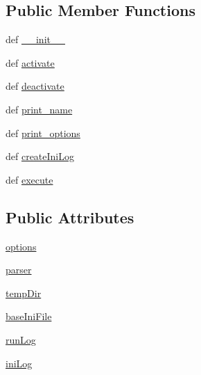 \subsection*{Public Member Functions}
\begin{DoxyCompactItemize}
\item 
def \hyperlink{classcombinatorial_1_1_combinatorial_ex_a9a4fbfcf64b1204c14509d348dd23b5d}{\-\_\-\-\_\-init\-\_\-\-\_\-}
\item 
def \hyperlink{classcombinatorial_1_1_combinatorial_ex_a8d0b7c0da355183d8124871bee76b0bd}{activate}
\item 
def \hyperlink{classcombinatorial_1_1_combinatorial_ex_ad53efcff93773cce7ed9cfc2fef38ab3}{deactivate}
\item 
def \hyperlink{classcombinatorial_1_1_combinatorial_ex_a19f6321bf42ab92280c5e3b0a3af89d0}{print\-\_\-name}
\item 
def \hyperlink{classcombinatorial_1_1_combinatorial_ex_ae802ad33a050ada42292e7c80fb3e486}{print\-\_\-options}
\item 
def \hyperlink{classcombinatorial_1_1_combinatorial_ex_ac0216f0d0041c35a91e01ac9dafd49da}{create\-Ini\-Log}
\item 
def \hyperlink{classcombinatorial_1_1_combinatorial_ex_a5a5fbd1692c100374ee458e4babc9832}{execute}
\end{DoxyCompactItemize}
\subsection*{Public Attributes}
\begin{DoxyCompactItemize}
\item 
\hyperlink{classcombinatorial_1_1_combinatorial_ex_a20eda525b3947495bb6084c560dcca27}{options}
\item 
\hyperlink{classcombinatorial_1_1_combinatorial_ex_ab5c27fece8991a34f47e85870637fc91}{parser}
\item 
\hyperlink{classcombinatorial_1_1_combinatorial_ex_a24b3bc621a8380e406bade192bc371d4}{temp\-Dir}
\item 
\hyperlink{classcombinatorial_1_1_combinatorial_ex_a68e6ac6cba4ab4161dd854323e549afd}{base\-Ini\-File}
\item 
\hyperlink{classcombinatorial_1_1_combinatorial_ex_a3de3f7da4c201525da8452258df0bc7b}{run\-Log}
\item 
\hyperlink{classcombinatorial_1_1_combinatorial_ex_a961a46d05fda7be52ea74a5f69df57e2}{ini\-Log}
\end{DoxyCompactItemize}


